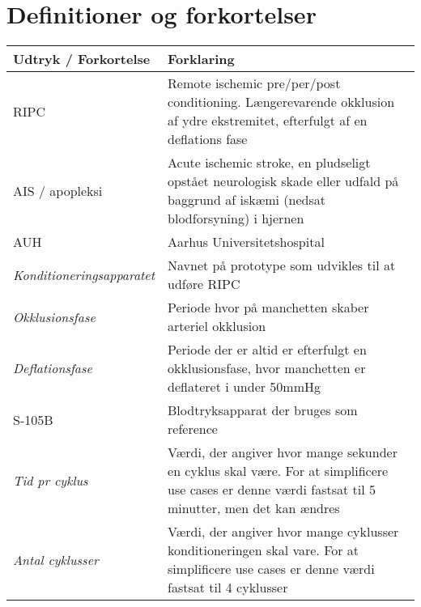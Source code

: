 	\newpage
	\section{Definitioner og forkortelser}
	\begin{longtable}{ |p{} |p{}| } 
		\hline
		\rowcolor{usDef}
		\textbf{Udtryk / Forkortelse} &  \textbf{Forklaring} \\
		\hline
		RIPC & Remote ischemic pre/per/post conditioning. Længerevarende okklusion af ydre ekstremitet, efterfulgt af en deflations fase\\
		\hline
		AIS / apopleksi & Acute ischemic stroke, en pludseligt opstået neurologisk skade eller udfald på baggrund af iskæmi (nedsat blodforsyning) i hjernen \\
		\hline
		AUH & Aarhus Universitetshospital \\
		\hline
		\textit{Konditioneringsapparatet} & Navnet på prototype som udvikles til at udføre RIPC \\
		\hline
		\textit{Okklusionsfase} & Periode hvor på manchetten skaber arteriel okklusion \\
		\hline
		\textit{Deflationsfase} & Periode der er altid er efterfulgt en okklusionsfase, hvor manchetten er deflateret i under 50mmHg\\
		\hline
		S-105B & Blodtryksapparat der bruges som reference \\
		\hline
		\textit{Tid pr cyklus} & Værdi, der angiver hvor mange sekunder en cyklus skal være. For at simplificere use cases er denne værdi fastsat til 5 minutter, men det kan ændres \\
		\hline
		\textit{Antal cyklusser} & Værdi, der angiver hvor mange cyklusser konditioneringen skal vare. For at simplificere use cases er denne værdi fastsat til 4 cyklusser \\
		\hline
	\end{longtable}